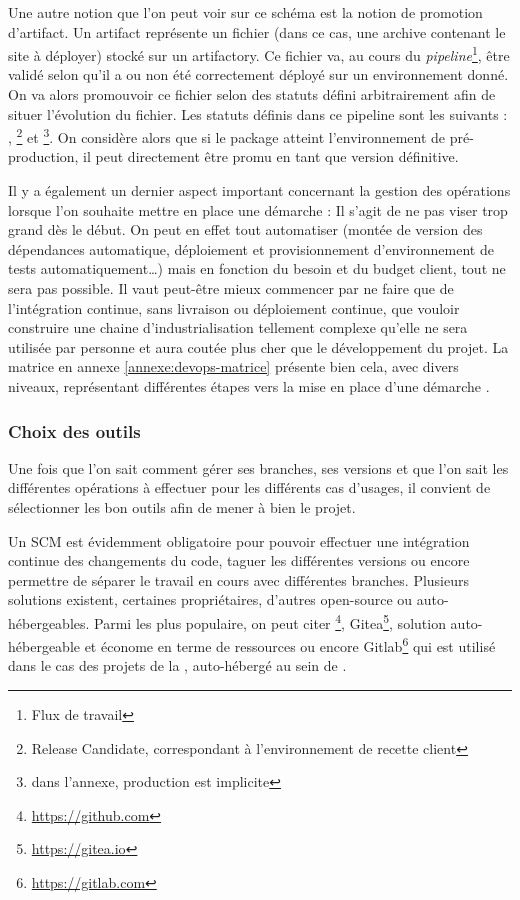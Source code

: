 Une autre notion que l'on peut voir sur ce schéma est la notion de promotion d'artifact. Un artifact représente un fichier (dans ce cas, une archive contenant le site à déployer) stocké sur un \gls{artifactory}. Ce fichier va, au cours du \emph{pipeline}\footnote{Flux de travail}, être validé selon qu'il a ou non été correctement déployé sur un environnement donné. On va alors promouvoir ce fichier selon des statuts défini arbitrairement afin de situer l'évolution du fichier. Les statuts définis dans ce pipeline sont les suivants : , \footnote{Release Candidate, correspondant à l'environnement de recette client} et \footnote{dans l'annexe, production est implicite}. On considère alors que si le package atteint l'environnement de pré-production, il peut directement être promu en tant que version définitive.

Il y a également un dernier aspect important concernant la gestion des opérations lorsque l'on souhaite mettre en place une démarche \devops : Il s'agit de ne pas viser trop grand dès le début. On peut en effet tout automatiser (montée de version des dépendances automatique, déploiement et provisionnement d'environnement de tests automatiquement\ldots) mais en fonction du besoin et du budget client, tout ne sera pas possible. Il vaut peut-être mieux commencer par ne faire que de l'intégration continue, sans livraison ou déploiement continue, que vouloir construire une chaine d'industrialisation tellement complexe qu'elle ne sera utilisée par personne et aura coutée plus cher que le développement du projet. La matrice en annexe \ref{annexe:devops-matrice} présente bien cela, avec divers niveaux, représentant différentes étapes vers la mise en place d'une démarche \devops.

\subsubsection{Choix des outils}

Une fois que l'on sait comment gérer ses branches, ses versions et que l'on sait les différentes opérations à effectuer pour les différents cas d'usages, il convient de sélectionner les bon outils afin de mener à bien le projet.

Un \gls{SCM} est évidemment obligatoire pour pouvoir effectuer une intégration continue des changements du code, taguer les différentes versions ou encore permettre de séparer le travail en cours avec différentes branches. Plusieurs solutions existent, certaines propriétaires, d'autres open-source ou auto-hébergeables. Parmi les plus populaire, on peut citer \github\footnote{\url{https://github.com}}, Gitea\footnote{\url{https://gitea.io}}, solution auto-hébergeable et économe en terme de ressources ou encore Gitlab\footnote{\url{https://gitlab.com}} qui est utilisé dans le cas des projets de la \naq, auto-hébergé au sein de \onepoint.

